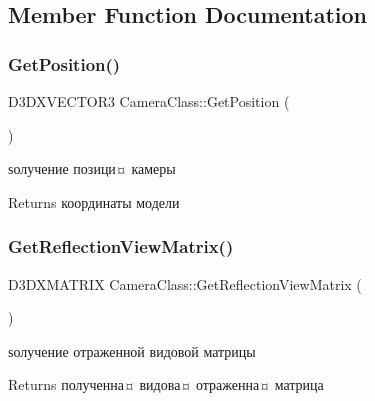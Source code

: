 \subsection{Member Function Documentation}
\mbox{\label{class_camera_class_a4a775d2e98bec6a3f6d8020e396cc3ea}} 
\subsubsection{\texorpdfstring{Get\+Position()}{GetPosition()}}
{\footnotesize\ttfamily D3\+D\+X\+V\+E\+C\+T\+O\+R3 Camera\+Class\+::\+Get\+Position (\begin{DoxyParamCaption}{ }\end{DoxyParamCaption})}



ѕолучение позици¤ камеры 

\begin{DoxyReturn}{Returns}
координаты модели 
\end{DoxyReturn}
\mbox{\label{class_camera_class_ae59c9f97c5da37e40fb081e53c630dbe}} 
\subsubsection{\texorpdfstring{Get\+Reflection\+View\+Matrix()}{GetReflectionViewMatrix()}}
{\footnotesize\ttfamily D3\+D\+X\+M\+A\+T\+R\+IX Camera\+Class\+::\+Get\+Reflection\+View\+Matrix (\begin{DoxyParamCaption}{ }\end{DoxyParamCaption})}



ѕолучение отраженной видовой матрицы 

\begin{DoxyReturn}{Returns}
полученна¤ видова¤ отраженна¤ матрица 
\end{DoxyReturn}
\mbox{\label{class_camera_class_ac982d11ed6b941665a53314334e87e33}} 
